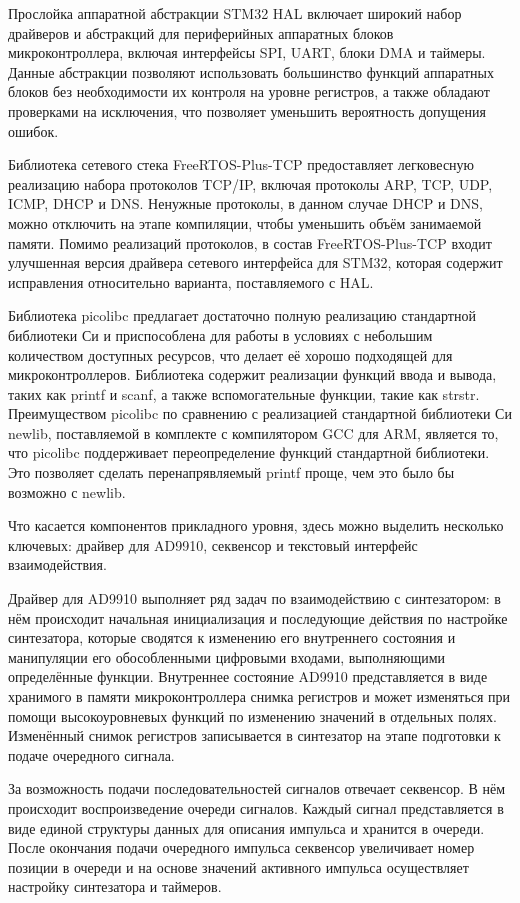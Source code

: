\documentclass{report}
\begin{document}
Прослойка аппаратной абстракции STM32 HAL включает широкий набор драйверов и абстракций для периферийных аппаратных блоков микроконтроллера, включая интерфейсы SPI, UART, блоки DMA и таймеры. Данные абстракции позволяют использовать большинство функций аппаратных блоков без необходимости их контроля на уровне регистров, а также обладают проверками на исключения, что позволяет уменьшить вероятность допущения ошибок.

Библиотека сетевого стека FreeRTOS-Plus-TCP предоставляет легковесную реализацию набора протоколов TCP/IP, включая протоколы ARP, TCP, UDP, ICMP, DHCP и DNS. Ненужные протоколы, в данном случае DHCP и DNS, можно отключить на этапе компиляции, чтобы уменьшить объём занимаемой памяти. Помимо реализаций протоколов, в состав FreeRTOS-Plus-TCP входит улучшенная версия драйвера сетевого интерфейса для STM32, которая содержит исправления относительно варианта, поставляемого с HAL.

Библиотека picolibc предлагает достаточно полную реализацию стандартной библиотеки Си и приспособлена для работы в условиях с небольшим количеством доступных ресурсов, что делает её хорошо подходящей для микроконтроллеров. Библиотека содержит реализации функций ввода и вывода, таких как printf и scanf, а также вспомогательные функции, такие как strstr. Преимуществом picolibc по сравнению с реализацией стандартной библиотеки Си newlib, поставляемой в комплекте с компилятором GCC для ARM, является то, что picolibc поддерживает переопределение функций стандартной библиотеки. Это позволяет сделать перенапрявляемый printf проще, чем это было бы возможно с newlib.

Что касается компонентов прикладного уровня, здесь можно выделить несколько ключевых: драйвер для AD9910, секвенсор и текстовый интерфейс взаимодействия.

Драйвер для AD9910 выполняет ряд задач по взаимодействию с синтезатором: в нём происходит начальная инициализация и последующие действия по настройке синтезатора, которые сводятся к изменению его внутреннего состояния и манипуляции его обособленными цифровыми входами, выполняющими определённые функции. Внутреннее состояние AD9910 представляется в виде хранимого в памяти микроконтроллера снимка регистров и может изменяться при помощи высокоуровневых функций по изменению значений в отдельных полях. Изменённый снимок регистров записывается в синтезатор на этапе подготовки к подаче очередного сигнала.

За возможность подачи последовательностей сигналов отвечает секвенсор. В нём происходит воспроизведение очереди сигналов. Каждый сигнал представляется в виде единой структуры данных для описания импульса и хранится в очереди. После окончания подачи очередного импульса секвенсор увеличивает номер позиции в очереди и на основе значений активного импульса осуществляет настройку синтезатора и таймеров.
\end{document}
